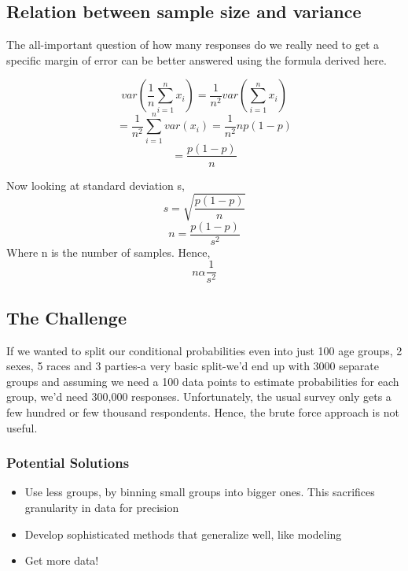 \subsection{Relation between sample size and variance}
The all-important question of how many responses do we really need to get a specific margin of error can be better answered using the formula derived here.

\begin{equation}
  var( \frac{1}{n} \sum_{i=1}^{n}  x_i) = \frac{1}{n^2}var( \sum_{i=1}^{n}  x_i) 
\end{equation}
\begin{equation}
    = \frac{1}{n^2} \sum_{i=1}^{n} var(x_i) = \frac{1}{n^2}np(1-p)
\end{equation}
\begin{equation}
    = \frac{p(1-p)}{n}
\end{equation}

Now looking at standard deviation s,\\
 \begin{equation}
    s = \sqrt{\frac{p(1-p)}{n}}
\end{equation}
 \begin{equation}
    n = \frac{p(1-p)}{s^2}
\end{equation}
Where n is the number of samples. Hence,
\begin{equation}
    n \alpha \frac{1}{s^2}
\end{equation}



\subsection{The Challenge}
If we wanted to split our conditional probabilities even into just 100 age groups, 2 sexes, 5 races and 3 parties-a very basic split-we'd end up with 3000 separate groups and assuming we need a 100 data points to estimate probabilities for each group, we'd need 300,000 responses. Unfortunately, the usual survey only gets a few hundred or few thousand respondents. 
Hence, the brute force approach is not useful.

\subsubsection{Potential Solutions}
\begin{itemize}
  \item Use less groups, by binning small groups into bigger ones. This sacrifices granularity in data for precision
  \item Develop sophisticated methods that generalize well, like modeling
  \item Get more data!
\end{itemize}

